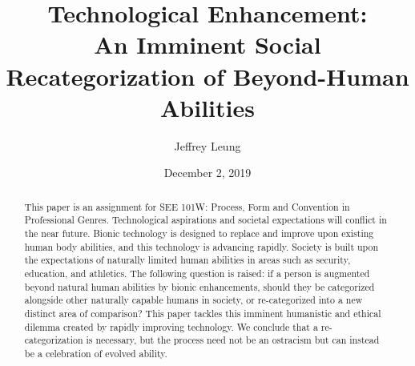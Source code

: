 \documentclass[10pt, oneside, letterpaper]{article}
\title{\textbf{Technological Enhancement:\\An Imminent Social Recategorization of Beyond-Human Abilities}}
\author{Jeffrey Leung}
\affil{Simon Fraser University}
\date{December 2, 2019}
\begin{document}
	\maketitle

	\begin{abstract}
		This paper is an assignment for SEE 101W: Process, Form and Convention in Professional Genres. Technological aspirations and societal expectations will conflict in the near future. Bionic technology is designed to replace and improve upon existing human body abilities, and this technology is advancing rapidly. Society is built upon the expectations of naturally limited human abilities in areas such as security, education, and athletics. The following question is raised: if a person is augmented beyond natural human abilities by bionic enhancements, should they be categorized alongside other naturally capable humans in society, or re-categorized into a new distinct area of comparison? This paper tackles this imminent humanistic and ethical dilemma created by rapidly improving technology. We conclude that a re-categorization is necessary, but the process need not be an ostracism but can instead be a celebration of evolved ability.
	\end{abstract}
\end{document}
